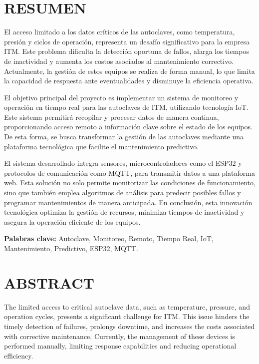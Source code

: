 \newpage

%
%

\section*{RESUMEN}

El acceso limitado a los datos críticos de las autoclaves, como temperatura, presión y ciclos de operación, representa un desafío significativo para la empresa ITM. Este problema dificulta la detección oportuna de fallos, alarga los tiempos de inactividad y aumenta los costos asociados al mantenimiento correctivo. Actualmente, la gestión de estos equipos se realiza de forma manual, lo que limita la capacidad de respuesta ante eventualidades y disminuye la eficiencia operativa.  

El objetivo principal del proyecto es implementar un sistema de monitoreo y operación en tiempo real para las autoclaves de ITM, utilizando tecnología IoT. Este sistema permitirá recopilar y procesar datos de manera continua, proporcionando acceso remoto a información clave sobre el estado de los equipos. De esta forma, se busca transformar la gestión de las autoclaves mediante una plataforma tecnológica que facilite el mantenimiento predictivo.  

El sistema desarrollado integra sensores, microcontroladores como el ESP32 y protocolos de comunicación como MQTT, para transmitir datos a una plataforma web. Esta solución no solo permite monitorizar las condiciones de funcionamiento, sino que también emplea algoritmos de análisis para predecir posibles fallos y programar mantenimientos de manera anticipada. En conclusión, esta innovación tecnológica optimiza la gestión de recursos, minimiza tiempos de inactividad y asegura la operación eficiente de los equipos.

\textbf{Palabras clave:} Autoclave, Monitoreo, Remoto, Tiempo Real, IoT, Mantenimiento, Predictivo, ESP32, MQTT.

\newpage

%
%

\section*{ABSTRACT}
The limited access to critical autoclave data, such as temperature, pressure, and operation cycles, presents a significant challenge for ITM. This issue hinders the timely detection of failures, prolongs downtime, and increases the costs associated with corrective maintenance. Currently, the management of these devices is performed manually, limiting response capabilities and reducing operational efficiency.

